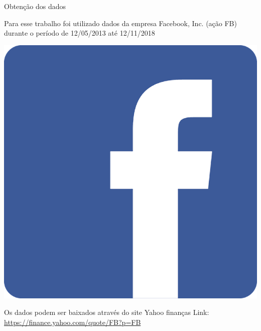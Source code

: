 \documentclass[10pt]{beamer}
\begin{document}
\begin{frame}{Obtenção dos dados}

  Para esse trabalho foi utilizado dados da empresa Facebook, Inc. (ação FB) durante o período de 12/05/2013 até 12/11/2018
  \begin{center}
    \includegraphics[scale=0.10]{images/facebook.png}
  \end{center}
  Os dados podem ser baixados através do site Yahoo finanças \newline
  Link: \url{https://finance.yahoo.com/quote/FB?p=FB}
\end{frame}
\end{document}

